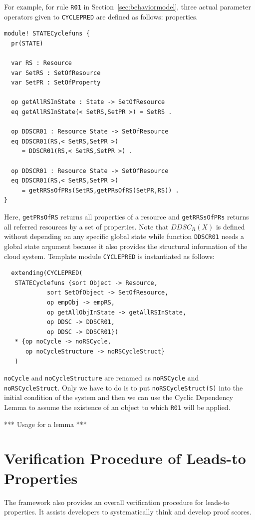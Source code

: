 \documentclass[12pt]{report}
\newcommand{\stt}[1]{{\small{\tt {#1}}}}
\begin{document}
For example, for rule {\tt R01} in Section~\ref{sec:behaviormodel},
three actual parameter operators given to {\tt CYCLEPRED} are defined
as follows: properties.
\begin{verbatim}
module! STATECyclefuns {
  pr(STATE)

  var RS : Resource
  var SetRS : SetOfResource
  var SetPR : SetOfProperty

  op getAllRSInState : State -> SetOfResource
  eq getAllRSInState(< SetRS,SetPR >) = SetRS .

  op DDSCR01 : Resource State -> SetOfResource
  eq DDSCR01(RS,< SetRS,SetPR >)
     = DDSCR01(RS,< SetRS,SetPR >) .

  op DDSCR01 : Resource State -> SetOfResource
  eq DDSCR01(RS,< SetRS,SetPR >)
     = getRRSsOfPRs(SetRS,getPRsOfRS(SetPR,RS)) .
}
\end{verbatim}
Here, {\tt getPRsOfRS} returns all properties of a resource and
{\tt getRRSsOfPRs} returns all referred resources by a set of
properties.  Note that $DDSC_R(X)$ is defined without depending on any
specific global state while function {\tt DDSCR01} needs a global state
argument because it also provides the structural information of the
cloud system. Template module {\tt CYCLEPRED} is instantiated as follows:
\begin{verbatim}
  extending(CYCLEPRED(
   STATECyclefuns {sort Object -> Resource,
            sort SetOfObject -> SetOfResource,
            op empObj -> empRS,
            op getAllObjInState -> getAllRSInState,
            op DDSC -> DDSCR01,
            op DDSC -> DDSCR01})
   * {op noCycle -> noRSCycle,
      op noCycleStructure -> noRSCycleStruct}
   )
\end{verbatim}
{\tt noCycle} and {\tt noCycleStructure} are renamed as
{\tt noRSCycle} and {\tt noRSCycleStruct}. Only we have to do is to
put \stt{noRSCycleStruct(S)} into the initial condition of the system
and then we can use the Cyclic Dependency Lemma to assume the
existence of an object to which {\tt R01} will be applied.

*** Usage for a lemma ***

\chapter{Verification Procedure of Leads-to Properties}
\label{chap:verification}
The framework also provides an overall verification procedure for
leads-to properties. It assists developers to systematically think and
develop proof scores.
\end{document}
